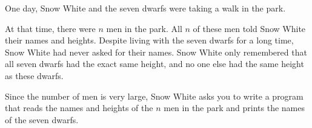 One day, Snow White and the seven dwarfs were taking a walk in the park.

At that time, there were $n$ men in the park. 
All $n$ of these men told Snow White their names and heights. 
Despite living with the seven dwarfs for a long time, Snow White had never asked for their names. 
Snow White only remembered that all seven dwarfs had the exact same height, and no one else had the same height as these dwarfs.

Since the number of men is very large, Snow White asks you to write a program that reads the names and heights of the $n$ men in the park and prints the names of the seven dwarfs.